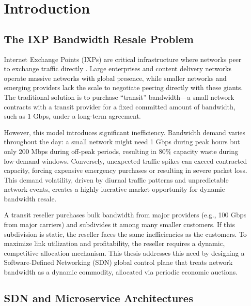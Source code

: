 
\chapter{Introduction}

\section{The IXP Bandwidth Resale Problem}

Internet Exchange Points (IXPs) are critical infrastructure where networks peer to exchange traffic directly \cite{lantzNetworkSoftwareMust2010, martinIXPPeeringAgreements2014}. Large enterprises and content delivery networks operate massive networks with global presence, while smaller networks and emerging providers lack the scale to negotiate peering directly with these giants. The traditional solution is to purchase ``transit'' bandwidth---a small network contracts with a transit provider for a fixed committed amount of bandwidth, such as 1 Gbps, under a long-term agreement.

However, this model introduces significant inefficiency. Bandwidth demand varies throughout the day: a small network might need 1 Gbps during peak hours but only 200 Mbps during off-peak periods, resulting in 80\% capacity waste during low-demand windows. Conversely, unexpected traffic spikes can exceed contracted capacity, forcing expensive emergency purchases or resulting in severe packet loss. This demand volatility, driven by diurnal traffic patterns and unpredictable network events, creates a highly lucrative market opportunity for dynamic bandwidth resale.

A transit reseller purchases bulk bandwidth from major providers (e.g., 100 Gbps from major carriers) and subdivides it among many smaller customers. If this subdivision is static, the reseller faces the same inefficiencies as the customers. To maximize link utilization and profitability, the reseller requires a dynamic, competitive allocation mechanism. This thesis addresses this need by designing a Software-Defined Networking (SDN) global control plane that treats network bandwidth as a dynamic commodity, allocated via periodic economic auctions.

\section{SDN and Microservice Architectures}

